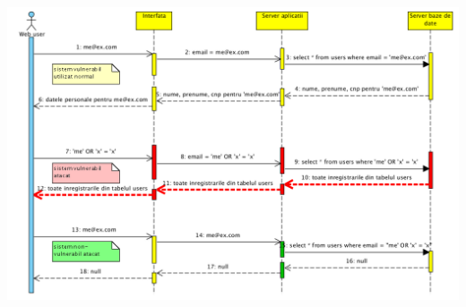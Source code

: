 \bigskip


\bigskip


\bigskip


\bigskip

 \includegraphics[width=7.1146in,height=4.6146in]{SecuritateaarhiveiRODA-img003.png} 


\bigskip

